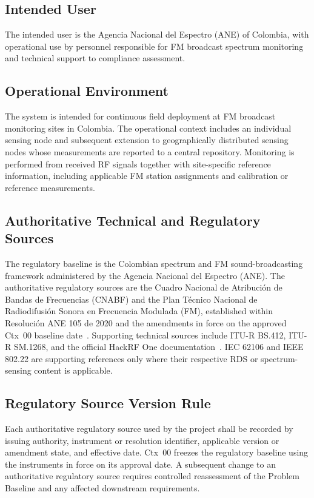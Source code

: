 \documentclass[12pt,a4paper]{report}
\begin{document}
 \subsection*{Intended User}
 The intended user is the Agencia Nacional del Espectro (ANE) of Colombia,
 with operational use by personnel responsible for FM broadcast spectrum
 monitoring and technical support to compliance assessment.
 \subsection*{Operational Environment}
 The system is intended for continuous field deployment at FM broadcast
 monitoring sites in Colombia. The operational context includes an individual
 sensing node and subsequent extension to geographically distributed sensing
 nodes whose measurements are reported to a central repository. Monitoring is
 performed from received RF signals together with site-specific reference
 information, including applicable FM station assignments and calibration or
 reference measurements.
 \subsection*{Authoritative Technical and Regulatory Sources}
 The regulatory baseline is the Colombian spectrum and FM sound-broadcasting
 framework administered by the Agencia Nacional del Espectro (ANE). The
 authoritative regulatory sources are the Cuadro Nacional de Atribuci\'{o}n de
 Bandas de Frecuencias (CNABF) and the Plan T\'{e}cnico Nacional de
 Radiodifusi\'{o}n Sonora en Frecuencia Modulada (FM), established within
 Resoluci\'{o}n ANE 105 de 2020 and the amendments in force on the approved
 Ctx~00 baseline date~\cite{ane105,ptnfm,cnbaf}. Supporting technical sources
 include ITU-R BS.412, ITU-R SM.1268, and the official HackRF One
 documentation~\cite{itur412,itur1268,hackrf}. IEC 62106 and IEEE 802.22 are
 supporting references only where their respective RDS or spectrum-sensing
 content is applicable.
 \subsection*{Regulatory Source Version Rule}
 Each authoritative regulatory source used by the project shall be recorded by
 issuing authority, instrument or resolution identifier, applicable version or
 amendment state, and effective date. Ctx~00 freezes the regulatory baseline
 using the instruments in force on its approval date. A subsequent change to an
 authoritative regulatory source requires controlled reassessment of the
 Problem Baseline and any affected downstream requirements.
\end{document}
